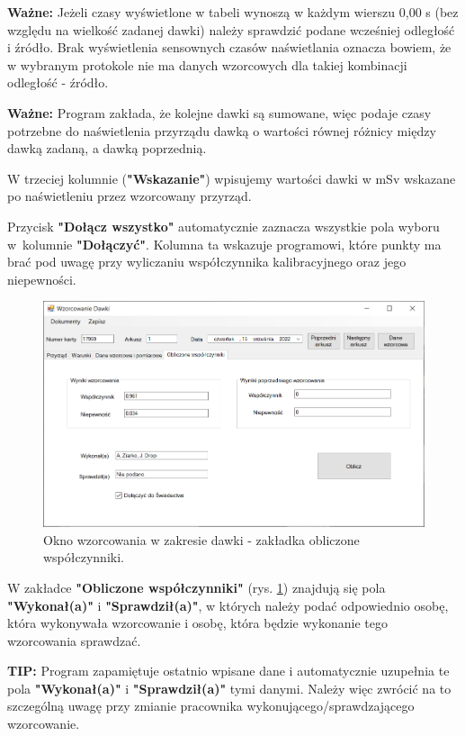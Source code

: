 \textbf{Ważne:} Jeżeli czasy wyświetlone w tabeli wynoszą w każdym wierszu 0,00 s (bez względu na wielkość zadanej dawki) należy sprawdzić podane wcześniej odległość i źródło. Brak wyświetlenia sensownych czasów naświetlania oznacza bowiem, że w wybranym protokole nie ma danych wzorcowych dla takiej kombinacji odległość - źródło.

\textbf{Ważne:} Program zakłada, że kolejne dawki są sumowane, więc podaje czasy potrzebne do naświetlenia przyrządu dawką o wartości równej różnicy między dawką zadaną, a dawką poprzednią.

W trzeciej kolumnie (\textbf{"Wskazanie"}) wpisujemy wartości dawki w mSv wskazane po naświetleniu przez wzorcowany przyrząd.

Przycisk \textbf{"Dołącz wszystko"} automatycznie zaznacza wszystkie pola wyboru w~kolumnie \textbf{"Dołączyć"}. Kolumna ta wskazuje programowi, które punkty ma brać pod uwagę przy wyliczaniu współczynnika kalibracyjnego oraz jego niepewności.

\begin{figure}[htb]
	\centering
	\includegraphics[width=\columnwidth]{obrazki/Wzorcowanie/dawka/wspolczynniki.png}
	\caption{Okno wzorcowania w zakresie dawki - zakładka obliczone współczynniki.}
	\label{dawkaWspolczynniki}
\end{figure}

W zakładce \textbf{"Obliczone współczynniki"} (rys. \ref{dawkaWspolczynniki}) znajdują się pola \textbf{"Wykonał(a)"} i \textbf{"Sprawdził(a)"}, w których należy podać odpowiednio osobę, która wykonywała wzorcowanie i osobę, która będzie wykonanie tego wzorcowania sprawdzać. 

\textbf{TIP:} Program zapamiętuje ostatnio wpisane dane i automatycznie uzupełnia te pola \textbf{"Wykonał(a)"} i \textbf{"Sprawdził(a)"} tymi danymi. Należy więc zwrócić na to szczególną uwagę przy zmianie pracownika wykonującego/sprawdzającego wzorcowanie.

